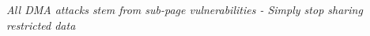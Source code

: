 \emph{All DMA attacks stem from sub-page vulnerabilities - Simply stop sharing restricted data}



\begin{comment}


\textcolor{blue}{
Our actionable conclusions:
\begin{enumerate}
    \item Static code analysis for DMA vulnerabilities.
    \item Remove DMA Mapping API, adopt DAMN instead. \label{act:damn}
    \item Remove mixed linear/non-linear skbs, add checks into \shinfo API.
    \item Better API is needed for I/O operations
    \begin{itemize}
        \item I/O buffer creation, discourage bad habits (build\_skb).
        \item Remove dma\_map\_single (Or adopt \ref{act:damn})
        \item Better memory allocation - namely I/O buffers like page\_frag, page\_pool or DAMN.
    \end{itemize}
\end{enumerate}
\texttt{All DMA attacks steam from this vulnerability.}
}
\end{comment}
